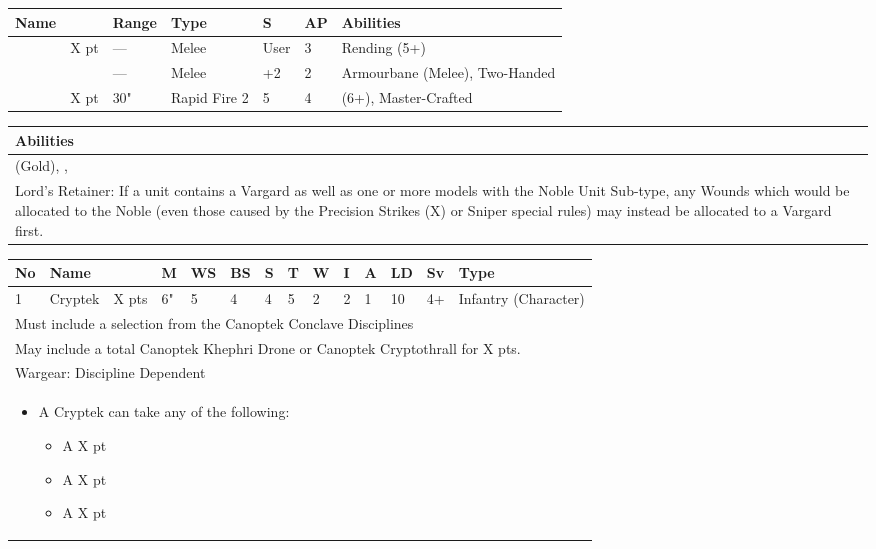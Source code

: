\noindent
\begin{tabular}{||m{110pt} m{30pt} m{31pt} m{55pt} m{12pt} m{12pt} m{210pt}||}
	\hline
	Name & & Range & Type & S & AP & Abilities \\
	\hline
	\quickref{Hyperphase Sword} & X pt & — & Melee & User & 3 & Rending (5+) \\
	\quickref{Warscythe} & & — & Melee & +2 & 2 & Armourbane (Melee), Two-Handed \\
	\quickref{Relic Gauss Blaster} & X pt & 30" & Rapid Fire 2 & 5 & 4 & \quickref{Gauss} (6+), Master-Crafted \\	
	\hline
\end{tabular}

\noindent
\begin{tabular}{||m{532pt}||}
	\hline
	Abilities \\
	\hline
	\quickref{Awakening Protocols}(Gold), \quickref{Living Metal}, \quickref{Reanimation Protocols} \\
	Lord's Retainer: If a unit contains a Vargard as well as one or more models with the Noble Unit Sub-type, any Wounds which would be allocated to the Noble (even those caused by the Precision Strikes (X) or Sniper special rules) may instead	be allocated to a Vargard first. \\
	\hline
\end{tabular}


\newpage
{}

\noindent
\begin{tabular}{||m{10pt} m{95pt} m{30pt} m{11pt} m{11pt} m{11pt} m{11pt} m{11pt} m{11pt} m{11pt} m{11pt} m{11pt} m{11pt} m{125pt}||}
	\hline
	No & Name & & M & WS & BS & S & T & W & I & A & LD & Sv & Type \\
	\hline
	1 & Cryptek & X pts & 6" & 5 & 4 & 4 & 5 & 2 & 2 & 1 & 10 & 4+ & Infantry (Character)\\
	\hline
	\hline
	\multicolumn{14}{||Z{532 pt}||}{Must include a selection from the Canoptek Conclave Disciplines}\\
	\multicolumn{14}{||Z{532 pt}||}{May include a total Canoptek Khephri Drone or Canoptek Cryptothrall for X pts.}\\	
	\hline
	\hline
	\multicolumn{14}{||Z{532 pt}||}{Wargear: Discipline Dependent} \\		
	\multicolumn{14}{||Z{532 pt}||}{\begin{itemize}
			\item A Cryptek can take any of the following:
			\begin{itemize}
				\item A \quickref{Phase Shifter} \hrulefill X pt
				\item A \quickref{Phylactery} \hrulefill X pt
				\item A \quickref{Sempiternal Weave} \hrulefill X pt
			\end{itemize}
	\end{itemize}} \\	
	\hline
\end{tabular}

